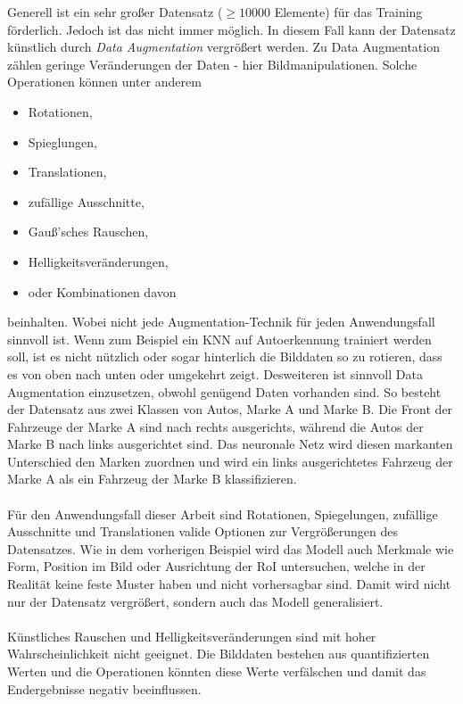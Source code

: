 Generell ist ein sehr großer Datensatz ($\ge10000$ Elemente) für das Training förderlich. Jedoch ist das nicht immer möglich. In diesem Fall kann der Datensatz künstlich durch \textit{Data Augmentation} vergrößert werden. Zu Data Augmentation zählen geringe Veränderungen der Daten - hier Bildmanipulationen. Solche Operationen können unter anderem
\begin{itemize}
	\item Rotationen,
	\item Spieglungen,
	\item Translationen,
	\item zufällige Ausschnitte,
	\item Gauß'sches Rauschen,
	\item Helligkeitsveränderungen,
	\item oder Kombinationen davon
\end{itemize}
beinhalten. Wobei nicht jede Augmentation-Technik für jeden Anwendungsfall sinnvoll ist. Wenn zum Beispiel ein KNN auf Autoerkennung trainiert werden soll, ist es nicht nützlich oder sogar hinterlich die Bilddaten so zu rotieren, dass es von oben nach unten oder umgekehrt zeigt. Desweiteren ist sinnvoll Data Augmentation einzusetzen, obwohl genügend Daten vorhanden sind. So besteht der Datensatz aus zwei Klassen von Autos, Marke A und Marke B. Die Front der Fahrzeuge der Marke A sind nach rechts ausgerichts, während die Autos der Marke B nach links ausgerichtet sind. Das neuronale Netz wird diesen markanten Unterschied den Marken zuordnen und wird ein links ausgerichtetes Fahrzeug der Marke A als ein Fahrzeug der Marke B klassifizieren.\cite{ref:augmentation}
\\\\
Für den Anwendungsfall dieser Arbeit sind Rotationen, Spiegelungen, zufällige Ausschnitte und Translationen valide Optionen zur Vergrößerungen des Datensatzes. Wie in dem vorherigen Beispiel wird das Modell auch Merkmale wie Form, Position im Bild oder Ausrichtung der RoI untersuchen, welche in der Realität keine feste Muster haben und nicht vorhersagbar sind. Damit wird nicht nur der Datensatz vergrößert, sondern auch das Modell generalisiert.
\\\\
Künstliches Rauschen und Helligkeitsveränderungen sind mit hoher Wahrscheinlichkeit nicht geeignet. Die Bilddaten bestehen aus quantifizierten Werten und die Operationen könnten diese Werte verfälschen und damit das Endergebnisse negativ beeinflussen.

